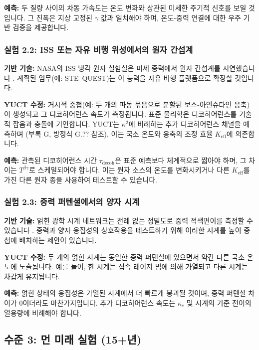 \documentclass[11pt,a4paper]{article}
\newcommand{\Keff}{K_{\mathrm{eff}}}
\begin{document}
	\textbf{예측:} 두 질량 사이의 차동 가속도는 온도 변화와 상관된 미세한 주기적 신호를 보일 것입니다. 그 진폭은 지상 교정된 $\gamma$ 값과 일치해야 하며, 온도-중력 연결에 대한 우주 기반 검증을 제공합니다.
	
	\subsubsection{실험 2.2: ISS 또는 자유 비행 위성에서의 원자 간섭계}
	
	\textbf{기반 기술:} NASA의 ISS 냉각 원자 실험실은 미세 중력에서 원자 간섭계를 시연했습니다 \cite{Aveline2020}. 계획된 임무(예: STE–QUEST)는 이 능력을 자유 비행 플랫폼으로 확장할 것입니다.
	
	\textbf{YUCT 수정:} 거시적 중첩(예: 두 개의 파동 묶음으로 분할된 보스-아인슈타인 응축)이 생성되고 그 디코히어런스 속도가 측정됩니다. 표준 물리학은 디코히어런스를 기술적 잡음과 충돌에 기인합니다. YUCT는 $\kappa^2$에 비례하는 추가 디코히어런스 채널을 예측하며 (부록 G, 방정식 G.?? 참조), 이는 국소 온도와 응축의 조정 효율 $\Keff$에 의존합니다.
	
	\textbf{예측:} 관측된 디코히어런스 시간 $\tau_{\mathrm{decoh}}$은 표준 예측보다 체계적으로 짧아야 하며, 그 차이는 $T^{\beta\gamma}$로 스케일되어야 합니다. 이는 원자 소스의 온도를 변화시키거나 다른 $\Keff$를 가진 다른 원자 종을 사용하여 테스트할 수 있습니다.
	
	\subsubsection{실험 2.3: 중력 퍼텐셜에서의 양자 시계}
	
	\textbf{기반 기술:} 얽힌 광학 시계 네트워크는 전례 없는 정밀도로 중력 적색편이를 측정할 수 있습니다 \cite{Katori2021}. 중력과 양자 응집성의 상호작용을 테스트하기 위해 이러한 시계를 높이 중첩에 배치하는 제안이 있습니다.
	
	\textbf{YUCT 수정:} 두 개의 얽힌 시계는 동일한 중력 퍼텐셜에 있으면서 약간 다른 국소 온도에 노출됩니다. 예를 들어, 한 시계는 집속 레이저 빔에 의해 가열되고 다른 시계는 차갑게 유지됩니다.
	
	\textbf{예측:} 얽힌 상태의 응집성은 가열된 시계에서 더 빠르게 붕괴될 것이며, 중력 퍼텐셜 차이가 0이더라도 마찬가지입니다. 추가 디코히어런스 속도는 $\kappa_c$ 및 시계의 기준 전이의 열용량에 비례해야 합니다.
	
	\subsection{수준 3: 먼 미래 실험 (15+년)}
	\label{subsec:far-tests}
	
\end{document}
